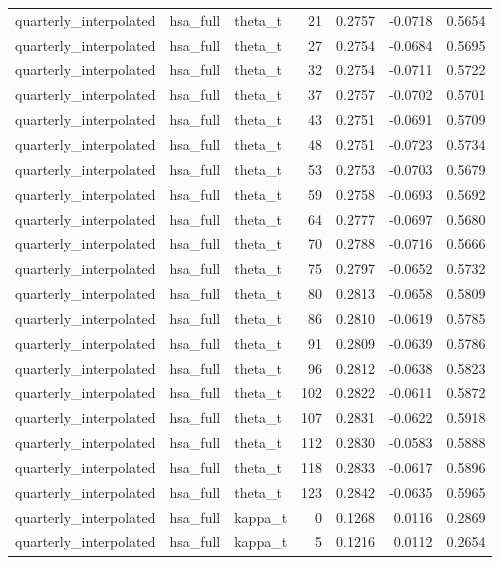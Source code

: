 \begin{tabular}{lllrrrr}
quarterly\_interpolated & hsa\_full & theta\_t & 21 & 0.2757 & -0.0718 & 0.5654 \\
quarterly\_interpolated & hsa\_full & theta\_t & 27 & 0.2754 & -0.0684 & 0.5695 \\
quarterly\_interpolated & hsa\_full & theta\_t & 32 & 0.2754 & -0.0711 & 0.5722 \\
quarterly\_interpolated & hsa\_full & theta\_t & 37 & 0.2757 & -0.0702 & 0.5701 \\
quarterly\_interpolated & hsa\_full & theta\_t & 43 & 0.2751 & -0.0691 & 0.5709 \\
quarterly\_interpolated & hsa\_full & theta\_t & 48 & 0.2751 & -0.0723 & 0.5734 \\
quarterly\_interpolated & hsa\_full & theta\_t & 53 & 0.2753 & -0.0703 & 0.5679 \\
quarterly\_interpolated & hsa\_full & theta\_t & 59 & 0.2758 & -0.0693 & 0.5692 \\
quarterly\_interpolated & hsa\_full & theta\_t & 64 & 0.2777 & -0.0697 & 0.5680 \\
quarterly\_interpolated & hsa\_full & theta\_t & 70 & 0.2788 & -0.0716 & 0.5666 \\
quarterly\_interpolated & hsa\_full & theta\_t & 75 & 0.2797 & -0.0652 & 0.5732 \\
quarterly\_interpolated & hsa\_full & theta\_t & 80 & 0.2813 & -0.0658 & 0.5809 \\
quarterly\_interpolated & hsa\_full & theta\_t & 86 & 0.2810 & -0.0619 & 0.5785 \\
quarterly\_interpolated & hsa\_full & theta\_t & 91 & 0.2809 & -0.0639 & 0.5786 \\
quarterly\_interpolated & hsa\_full & theta\_t & 96 & 0.2812 & -0.0638 & 0.5823 \\
quarterly\_interpolated & hsa\_full & theta\_t & 102 & 0.2822 & -0.0611 & 0.5872 \\
quarterly\_interpolated & hsa\_full & theta\_t & 107 & 0.2831 & -0.0622 & 0.5918 \\
quarterly\_interpolated & hsa\_full & theta\_t & 112 & 0.2830 & -0.0583 & 0.5888 \\
quarterly\_interpolated & hsa\_full & theta\_t & 118 & 0.2833 & -0.0617 & 0.5896 \\
quarterly\_interpolated & hsa\_full & theta\_t & 123 & 0.2842 & -0.0635 & 0.5965 \\
quarterly\_interpolated & hsa\_full & kappa\_t & 0 & 0.1268 & 0.0116 & 0.2869 \\
quarterly\_interpolated & hsa\_full & kappa\_t & 5 & 0.1216 & 0.0112 & 0.2654 \\

\end{tabular}
